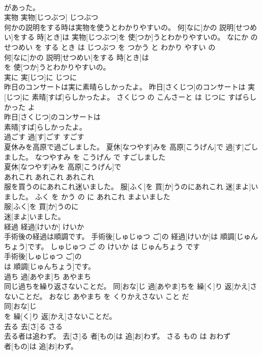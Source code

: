 \documentclass[8pt]{extreport}
\begin{document}
\begin{CJK}{UTF8}{min}
\\	があった。			
\\	実物	実物[じつぶつ]	じつぶつ	
\\	何かの説明をする時は実物を使うとわかりやすいの。	何[なに]かの 説明[せつめい]をする 時[とき]は 実物[じつぶつ]を 使[つか]うとわかりやすいの。	なにか の せつめい を する とき は じつぶつ を つかう と わかり やすい の	
\\	何[なに]かの 説明[せつめい]をする 時[とき]は
\\	を 使[つか]うとわかりやすいの。			
\\	実に	実[じつ]に	じつに	
\\	昨日のコンサートは実に素晴らしかったよ。	昨日[さくじつ]のコンサートは 実[じつ]に 素晴[すば]らしかったよ。	さくじつ の こんさーと は じつに すばらしかった よ	
\\	昨日[さくじつ]のコンサートは
\\	素晴[すば]らしかったよ。			
\\	過ごす	過[す]ごす	すごす	
\\	夏休みを高原で過ごしました。	夏休[なつやす]みを 高原[こうげん]で 過[す]ごしました。	なつやすみ を こうげん で すごしました	
\\	夏休[なつやす]みを 高原[こうげん]で
\\	あれこれ	あれこれ	あれこれ	
\\	服を買うのにあれこれ迷いました。	服[ふく]を 買[か]うのにあれこれ 迷[まよ]いました。	ふく を かう の に あれこれ まよいました	
\\	服[ふく]を 買[か]うのに
\\	迷[まよ]いました。			
\\	経過	経過[けいか]	けいか	
\\	手術後の経過は順調です。	手術後[しゅじゅつ ご]の 経過[けいか]は 順調[じゅんちょう]です。	しゅじゅつ ご の けいか は じゅんちょう です	
\\	手術後[しゅじゅつ ご]の
\\	は 順調[じゅんちょう]です。			
\\	過ち	過[あやま]ち	あやまち	
\\	同じ過ちを繰り返さないことだ。	同[おな]じ 過[あやま]ちを 繰[く]り 返[かえ]さないことだ。	おなじ あやまち を くりかえさない こと だ	
\\	同[おな]じ
\\	を 繰[く]り 返[かえ]さないことだ。			
\\	去る	去[さ]る	さる	
\\	去る者は追わず。	去[さ]る 者[もの]は 追[お]わず。	さる もの は おわず	
\\	者[もの]は 追[お]わず。			

\end{CJK}
\end{document}
